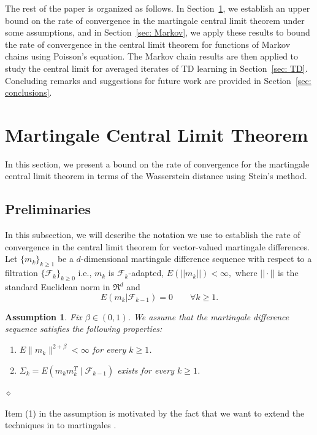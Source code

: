 \documentclass[11pt]{article}
\newtheorem{assumption}{Assumption}
\begin{document}
The rest of the paper is organized as follows. In Section~\ref{sec: Martingales}, we establish an upper bound on the rate of convergence in the martingale central limit theorem under some assumptions, and in Section~\ref{sec: Markov}, we apply these results to bound the rate of convergence in the central limit theorem for functions of Markov chains using Poisson's equation. The Markov chain results are then applied to study the central limit for averaged iterates of TD learning in Section~\ref{sec: TD}. Concluding remarks and suggestions for future work are provided in Section~\ref{sec: conclusions}.

\section{Martingale Central Limit Theorem}\label{sec: Martingales}

In this section, we present a bound on the rate of convergence for the martingale central limit theorem in terms of the Wasserstein distance using Stein's method.

\subsection{Preliminaries}

In this subsection, we will describe the notation we use to establish the rate of convergence in the central limit theorem for vector-valued martingale differences. Let $\{m_k\}_{k\geq 1}$ be a $d$-dimensional martingale difference sequence with respect to a filtration $\{\mathcal{F}_k\}_{k\geq 0}$ i.e., $m_k$ is $\mathcal{F}_k$-adapted, $E(||m_k||)<\infty,$ where $||\cdot||$ is the standard Euclidean norm in $\Re^d$ and $$E(m_k|\mathcal{F}_{k-1})=0\qquad \forall k\geq 1.$$ 
\begin{assumption}\label{assume: martingale}
Fix $\beta\in(0,1)$. We assume that the martingale difference sequence satisfies the following properties:
\begin{enumerate}\label{assume}
\item $E\|m_k\|^{2+\beta}<\infty$ for every $k\geq 1$.
\item $\Sigma_k=E(m_km_k^T\mid\mathcal{F}_{k-1})$ exists for every $k\geq 1$.
\end{enumerate}
\hfill $\diamond$
\end{assumption}
Item (1) in the assumption is motivated by the fact that we want to extend the techniques in \citep{gallouet2018regularity} to martingales .
\end{document}
